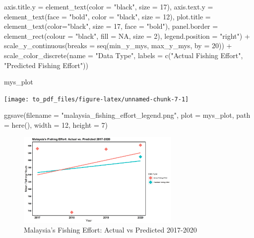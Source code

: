 \documentclass[
]{article}
\newenvironment{Shaded}{\begin{snugshade}}{\end{snugshade}}
\newcommand{\AttributeTok}[1]{\textcolor[rgb]{0.77,0.63,0.00}{#1}}
\newcommand{\ConstantTok}[1]{\textcolor[rgb]{0.00,0.00,0.00}{#1}}
\newcommand{\DecValTok}[1]{\textcolor[rgb]{0.00,0.00,0.81}{#1}}
\newcommand{\FunctionTok}[1]{\textcolor[rgb]{0.00,0.00,0.00}{#1}}
\newcommand{\NormalTok}[1]{#1}
\newcommand{\SpecialCharTok}[1]{\textcolor[rgb]{0.00,0.00,0.00}{#1}}
\newcommand{\StringTok}[1]{\textcolor[rgb]{0.31,0.60,0.02}{#1}}
\begin{document}
\begin{Shaded}
\begin{Highlighting}[]
         \AttributeTok{axis.title.y =} \FunctionTok{element\_text}\NormalTok{(}\AttributeTok{color =} \StringTok{"black"}\NormalTok{, }\AttributeTok{size =} \DecValTok{17}\NormalTok{),}
         \AttributeTok{axis.text.y =} \FunctionTok{element\_text}\NormalTok{(}\AttributeTok{face =} \StringTok{"bold"}\NormalTok{, }\AttributeTok{color =} \StringTok{"black"}\NormalTok{, }\AttributeTok{size =} \DecValTok{12}\NormalTok{),}
         \AttributeTok{plot.title =} \FunctionTok{element\_text}\NormalTok{(}\AttributeTok{color=}\StringTok{"black"}\NormalTok{, }\AttributeTok{size =} \DecValTok{17}\NormalTok{, }\AttributeTok{face =} \StringTok{"bold"}\NormalTok{),}
         \AttributeTok{panel.border =} \FunctionTok{element\_rect}\NormalTok{(}\AttributeTok{colour =} \StringTok{"black"}\NormalTok{, }\AttributeTok{fill =} \ConstantTok{NA}\NormalTok{, }\AttributeTok{size =} \DecValTok{2}\NormalTok{),}
         \AttributeTok{legend.position =} \StringTok{"right"}\NormalTok{) }\SpecialCharTok{+}
   \FunctionTok{scale\_y\_continuous}\NormalTok{(}\AttributeTok{breaks =} \FunctionTok{seq}\NormalTok{(min\_y\_mys, max\_y\_mys, }\AttributeTok{by =} \DecValTok{20}\NormalTok{)) }\SpecialCharTok{+}
   \FunctionTok{scale\_color\_discrete}\NormalTok{(}\AttributeTok{name =} \StringTok{"Data Type"}\NormalTok{, }\AttributeTok{labels =} \FunctionTok{c}\NormalTok{(}\StringTok{"Actual Fishing Effort"}\NormalTok{, }\StringTok{"Predicted Fishing Effort"}\NormalTok{))}

\NormalTok{mys\_plot}
\end{Highlighting}
\end{Shaded}

\texttt{[image: to\_pdf\_files/figure-latex/unnamed-chunk-7-1]}

\begin{Shaded}
\begin{Highlighting}[]
\FunctionTok{ggsave}\NormalTok{(}\AttributeTok{filename =} \StringTok{"malaysia\_fishing\_effort\_legend.png"}\NormalTok{, }\AttributeTok{plot =}\NormalTok{ mys\_plot, }\AttributeTok{path =} \FunctionTok{here}\NormalTok{(), }\AttributeTok{width =} \DecValTok{12}\NormalTok{,}
  \AttributeTok{height =} \DecValTok{7}\NormalTok{)}
\end{Highlighting}
\end{Shaded}

\begin{figure}
\centering
\includegraphics[width=0.7\textwidth,height=\textheight]{pictures/malaysia_fishing_effort_legend.png}
\caption{Malaysia's Fishing Effort: Actual vs Predicted 2017-2020}
\end{figure}
\end{document}
